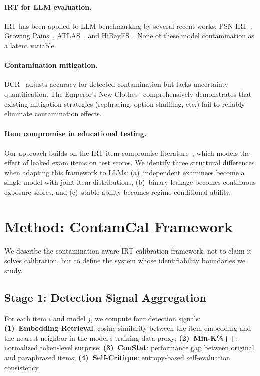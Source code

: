 \documentclass[letterpaper, 10pt, twocolumn]{article}
\begin{document}
\paragraph{IRT for LLM evaluation.}
IRT has been applied to LLM benchmarking by several recent works: PSN-IRT~\citep{polo2024tinybenchmarks}, Growing Pains~\citep{bhattpain}, ATLAS~\citep{zhuang2024atlas}, and HiBayES~\citep{paganini2024hibayes}.
None of these model contamination as a latent variable.

\paragraph{Contamination mitigation.}
DCR~\citep{yang2023rethinking} adjusts accuracy for detected contamination but lacks uncertainty quantification.
The Emperor's New Clothes~\citep{oren2025emperor} comprehensively demonstrates that existing mitigation strategies (rephrasing, option shuffling, etc.) fail to reliably eliminate contamination effects.

\paragraph{Item compromise in educational testing.}
Our approach builds on the IRT item compromise literature~\citep{eckerly2017detecting,sinharay2017detection}, which models the effect of leaked exam items on test scores.
We identify three structural differences when adapting this framework to LLMs: (a)~independent examinees become a single model with joint item distributions, (b)~binary leakage becomes continuous exposure scores, and (c)~stable ability becomes regime-conditional ability.

\section{Method: ContamCal Framework}

We describe the contamination-aware IRT calibration framework, not to claim it solves calibration, but to define the system whose identifiability boundaries we study.

\subsection{Stage 1: Detection Signal Aggregation}

For each item $i$ and model $j$, we compute four detection signals:
\textbf{(1)~Embedding Retrieval}: cosine similarity between the item embedding and the nearest neighbor in the model's training data proxy;
\textbf{(2)~Min-K\%++}: normalized token-level surprise;
\textbf{(3)~ConStat}: performance gap between original and paraphrased items;
\textbf{(4)~Self-Critique}: entropy-based self-evaluation consistency.
\end{document}

